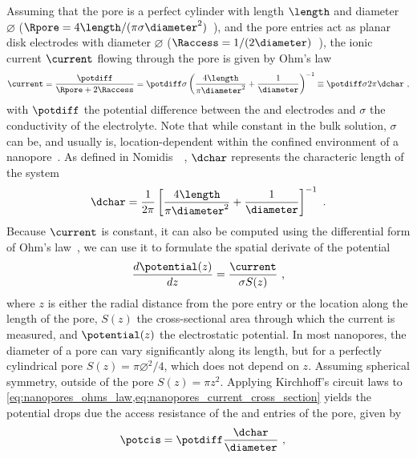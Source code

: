 Assuming that the pore is a perfect cylinder with length $\length$ and diameter $\diameter$ ($\Rpore = 4
\length / (\pi \sigma \diameter^2)$~\cite{Grosberg-2010}), and the pore entries act as planar disk electrodes
with diameter $\diameter$ ($\Raccess = 1 / (2\diameter)$~\cite{Hall-1975}), the ionic current $\current$
flowing through the pore is given by Ohm's law~\cite{Kowalczyk-2011}
%
\begin{equation}\label{eq:nanopores_ohms_law}
  \current = \dfrac{\potdiff}{\Rpore + 2 \Raccess} 
           = \potdiff \sigma \left( \dfrac{4 \length}{\pi \diameter^2} + \dfrac{1}{\diameter} \right)^{-1}
           \equiv \potdiff \sigma 2 \pi \dchar
  \text{ ,}
\end{equation}
%
with $\potdiff$ the potential difference between the \cisi{} and \transi{} electrodes and $\sigma$ the
conductivity of the electrolyte. Note that while constant in the bulk solution, $\sigma$ can be, and usually
is, location-dependent within the confined environment of a nanopore~\cite{Chinappi-2015}. As defined in
Nomidis~\etal{}~\cite{Nomidis-2018}, $\dchar$ represents the characteric length of the system
%
\begin{equation}\label{eq:nanopores_characteristic_length}
  \dchar = \dfrac{1}{2\pi} \left[\dfrac{4 \length}{\pi\diameter^2} + \dfrac{1}{\diameter} \right]^{-1}
  \text{ .}
\end{equation}
%
Because $\current$ is constant, it can also be computed using the differential form of Ohm's
law~\cite{Chinappi-2015}, we can use it to formulate the spatial derivate of the potential
%
\begin{equation}\label{eq:nanopores_current_cross_section}
  \dfrac{d \potential(z)}{dz} = \dfrac{\current}{\sigma S(z)}
  \text{ ,}
\end{equation}
%
where $z$ is either the radial distance from the pore entry or the location along the length of the pore,
$S(z)$ the cross-sectional area through which the current is measured, and $\potential(z)$ the electrostatic
potential. In most nanopores, the diameter of a pore can vary significantly along its length, but for a
perfectly cylindrical pore $S(z) = \pi \diameter^2 / 4$, which does not depend on $z$. Assuming spherical
symmetry, outside of the pore $S(z) = \pi z^2$. Applying Kirchhoff's circuit laws to
\cref{eq:nanopores_ohms_law,eq:nanopores_current_cross_section} yields the potential drops due the access
resistance of the \cisi{} and \transi{} entries of the pore, given by
%
\begin{align}
  \potcis   ={}& \potdiff \dfrac{\dchar}{\diameter}
  \text{ ,}
\end{align}
